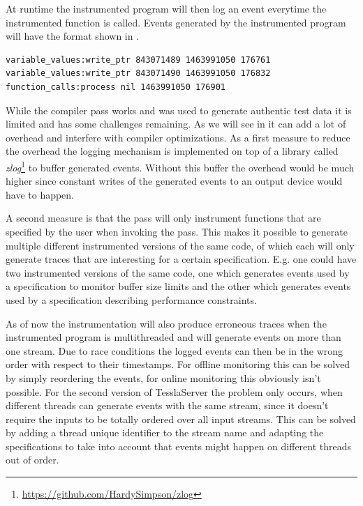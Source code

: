 At runtime the instrumented program will then log an event everytime the instrumented function is called.
Events generated by the instrumented program will have the format shown in .

\begin{lstlisting}[numbers=none,float,caption={[Trace data format of the instrumentation pass]Trace data generated by the instrumentation pass. Each line represents an event and each event consists of four pieces seperated by spaces: a stream name, an optional value and the timestamp in unix format followed by the amount of microseconds since that timestamp.},label=listing:instrumentation_trace_data]
variable_values:write_ptr 843071489 1463991050 176761
variable_values:write_ptr 843071490 1463991050 176832
function_calls:process nil 1463991050 176901
\end{lstlisting}

While the compiler pass works and was used to generate authentic test data it is limited and has some challenges remaining.
As we will see in  it can add a lot of overhead and interfere with compiler optimizations.
As a first measure to reduce the overhead the logging mechanism is implemented on top of a library called \emph{zlog}\footnote{\url{https://github.com/HardySimpson/zlog}} to buffer generated events.
Without this buffer the overhead would be much higher since constant writes of the generated events to an output device would have to happen.

A second measure is that the pass will only instrument functions that are specified by the user when invoking the pass.
This makes it possible to generate multiple different instrumented versions of the same code, of which each will only generate traces that are interesting for a certain specification.
E.g. one could have two instrumented versions of the same code, one which generates events used by a specification to monitor buffer size limits and the other which generates events used by a specification describing performance constraints.

As of now the instrumentation will also produce erroneous traces when the instrumented program is multithreaded and will generate events on more than one stream.
Due to race conditions the logged events can then be in the wrong order with respect to their timestamps.
For offline monitoring this can be solved by simply reordering the events, for online monitoring this obviously isn't possible.
For the second version of TesslaServer the problem only occurs, when different threads can generate events with the same stream, since it doesn't require the inputs to be totally ordered over all input streams.
This can be solved by adding a thread unique identifier to the stream name and adapting the specifications to take into account that events might happen on different threads out of order.

